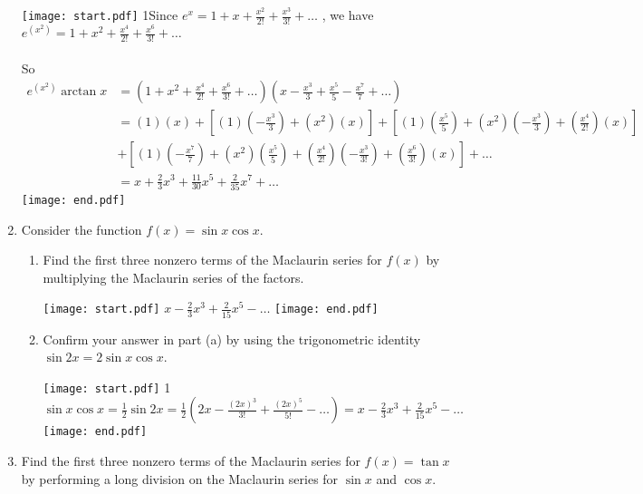 \documentclass[12pt]{article}
\begin{document}
\begin{enumerate}
\texttt{[image: start.pdf]}
{{{1\linewidth}{Since $\textstyle e^x=1+x+\frac{x^2}{2!}+\frac{x^3}{3!}+\ldots$ \text{ }, we have $\textstyle e^{(x^2)}=1+x^2+\frac{x^4}{2!}+\frac{x^6}{3!}+\ldots$ 
\\ \\ So \begin{align*}  e^{(x^2)}\arctan{x} &= \left(1+x^2+\frac{x^4}{2!}+\frac{x^6}{3!}+\ldots\right) \left(x-\frac{x^3}{3}+\frac{x^5}{5}-\frac{x^7}{7}+\ldots\right) 
\\ &=(1)(x) +\left[(1)\left(-\frac{x^3}{3}\right)+(x^2)(x)\right]+\left[(1)\left(\frac{x^5}{5}\right)+(x^2)\left(-\frac{x^3}{3}\right)+\left(\frac{x^4}{2!}\right)(x) \right] 
\\ &+ \left[(1)\left(-\frac{x^7}{7}\right)+(x^2)\left(\frac{x^5}{5}\right)+\left(\frac{x^4}{2!}\right)\left(-\frac{x^3}{3!}\right)+\left(\frac{x^6}{3!}\right)(x) \right] +\ldots
\\ &=x+\frac{2}{3}x^3+\frac{11}{30}x^5+\frac{2}{35}x^7+\ldots \end{align*} }}}
\texttt{[image: end.pdf]}


\item Consider the function $f(x)=\sin{x}\cos{x}$.

\begin{enumerate}

\item Find the first three nonzero terms of the Maclaurin series for $f(x)$ by multiplying the Maclaurin series of the factors.

\texttt{[image: start.pdf]}
{{$x-\frac{2}{3}x^3+\frac{2}{15}x^5-\ldots$ }}
\texttt{[image: end.pdf]}


\item Confirm your answer in part (a) by using the trigonometric identity \\$\sin{2x}=2\sin{x}\cos{x}$.

\texttt{[image: start.pdf]}
{{{1\linewidth}{$\sin{x}\cos{x}=\frac{1}{2}\sin{2x}=\frac{1}{2}\left(2x-\frac{(2x)^3}{3!}+\frac{(2x)^5}{5!}-\ldots \right)=x-\frac{2}{3}x^3+\frac{2}{15}x^5-\ldots$ }}}
\texttt{[image: end.pdf]}


\end{enumerate}

\item Find the first three nonzero terms of the Maclaurin series for $f(x)=\tan{x}$ by performing a long division on the Maclaurin series for $\sin{x}$ and $\cos{x}$.


\end{enumerate}
\end{document}
